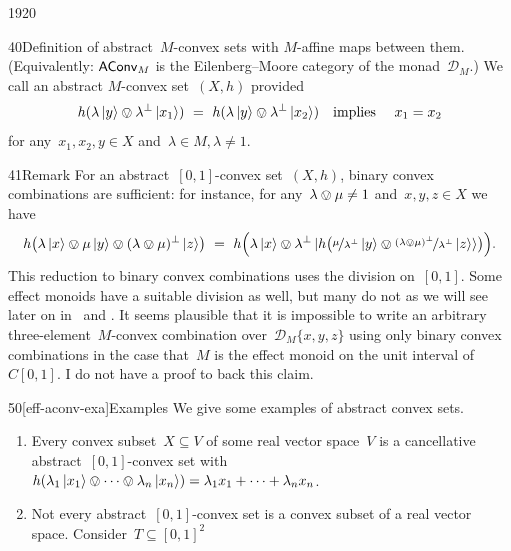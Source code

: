 \begin{parsec}{1920}
\begin{point}{40}{Definition}
    of abstract~$M$-convex sets with
    $M$-affine maps between them.
(Equivalently: $\mathsf{AConv}_M$
    is the Eilenberg--Moore category
    of the monad~$\mathcal{D}_M$.)
We call an abstract $M$-convex set~$(X,h)$ 
provided
\begin{equation*}
    h(\lambda \ket{y} \ovee \lambda^\perp \ket{x_1})\  = \
    h(\lambda \ket{y} \ovee \lambda^\perp \ket{x_2})
    \quad\text{implies}\quad~x_1=x_2
\end{equation*}
    for any~$x_1,x_2,y \in X$ and~$\lambda \in M, \lambda \neq 1$.
\begin{point}{41}{Remark}%
    For an abstract~$[0,1]$-convex set~$(X,h)$,
    binary convex combinations are sufficient:
    for instance, for any~$\lambda \ovee \mu \neq 1$
        and~$x,y,z \in X$ we have
\begin{equation*}
    h \bigl(\lambda \ket{x} \ovee \mu \ket{y} \ovee
        (\lambda \ovee \mu)^\perp \ket{z}\bigr)
        \ = \ 
    h\Bigl(\lambda \ket{x}
        \ovee \lambda^\perp \ket{
            h\bigl( \nicefrac{\mu}{\lambda^\perp} \ket{y}
        \ovee \nicefrac{(\lambda \ovee \mu)^\perp}{\lambda^\perp}
        \ket{z}}\bigr)\Bigr).
\end{equation*}
This reduction to binary convex combinations uses
    the division on~$[0,1]$.
Some effect monoids have a suitable division as well,
        but many do not
    as we will see later on
        in~ and .
It seems plausible that
    it is impossible to write an arbitrary
    three-element~$M$-convex combination
    over~$\mathcal{D}_M \{x,y,z\}$
    using only binary convex combinations
    in the case that~$M$ is the effect monoid
        on the unit interval of~$C[0,1]$.
I do not have a proof to  back this claim.
\end{point}
\end{point}
\begin{point}{50}[eff-aconv-exa]{Examples}%
We give some examples of abstract convex sets.
\begin{enumerate}
\item
Every convex subset~$X \subseteq V$
    of some real vector space~$V$
    is a cancellative abstract~$[0,1]$-convex set
    with~$h(\lambda_1 \ket{x_1} \ovee \cdots \ovee \lambda_n \ket{x_n})
            = \lambda_1 x_1 + \cdots + \lambda_n x_n$.
\item
Not every abstract~$[0,1]$-convex set is
    a convex subset of a real vector space.
Consider~$T \subseteq [0,1]^2$

\end{enumerate}
\end{point}
\end{parsec}
